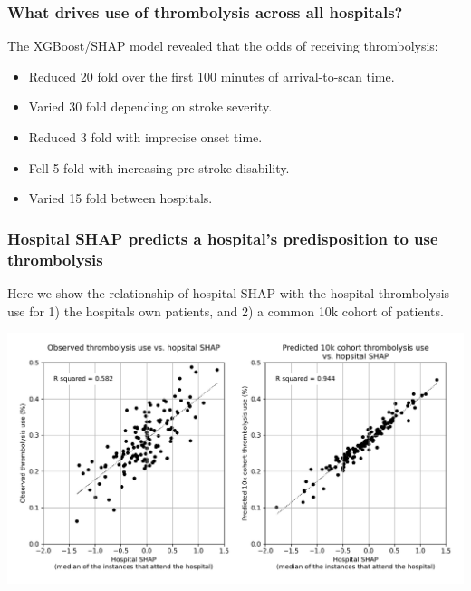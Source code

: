 \documentclass{beamer}
\begin{document}

\begin{frame}
\frametitle{What drives use of thrombolysis across all hospitals?}

The XGBoost/SHAP model revealed that the odds of receiving thrombolysis:

\begin{itemize}
    \item Reduced 20 fold over the first 100 minutes of arrival-to-scan time.
    \item Varied 30 fold depending on stroke severity.
    \item Reduced 3 fold with imprecise onset time.
    \item Fell 5 fold with increasing pre-stroke disability.
    \item Varied 15 fold between hospitals. 
\end{itemize}

\end{frame}


\begin{frame}
\frametitle{Hospital SHAP predicts a hospital's predisposition to use thrombolysis}

\footnotesize Here we show the relationship of hospital SHAP with the hospital thrombolysis use for 1) the hospitals own patients, and 2) a common 10k cohort of patients.

\begin{center}
\includegraphics[width=1.0\textwidth]{./images/99_twin_correlation_scatter.jpg}
\end{center}
\end{frame}

\end{document}
